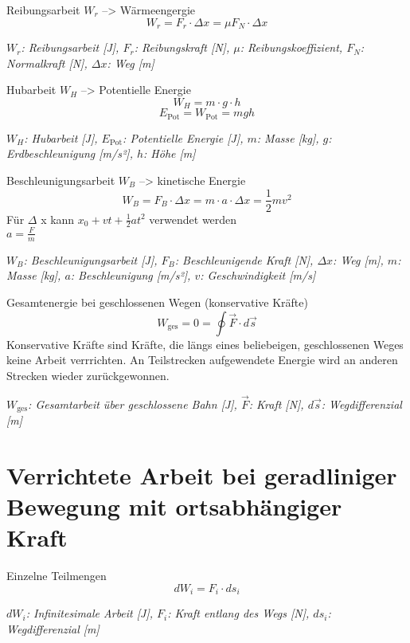 \documentclass[a4paper,10pt]{article}
\newenvironment{displayformula}
{
	\begin{framed}
		\color{formulaColor}
	}
	{\end{framed}}
\newcommand{\formulalegend}[1]{%
	\par\vspace{0.5ex}%
	{{\color{legendColor}\RaggedRight\small\textit{#1}}}%
	\par\vspace{1.5ex}%
}
\begin{document}
\begin{displayformula}
	Reibungsarbeit \( W_r \) --> Wärmeengergie
	\[
	W_r = F_r \cdot \Delta x = \mu F_N \cdot \Delta x
	\]
\end{displayformula}
\formulalegend{
	\( W_r \): Reibungsarbeit [J], \( F_r \): Reibungskraft [N], \( \mu \): Reibungskoeffizient, \( F_N \): Normalkraft [N], \( \Delta x \): Weg [m]
}

\begin{displayformula}
	Hubarbeit \( W_H \) --> Potentielle Energie
	\[
	W_H = m \cdot g \cdot h
	\]
	\[
	E_{\text{Pot}} = W_{\text{Pot}} = mgh
	\]
\end{displayformula}
\formulalegend{
	\( W_H \): Hubarbeit [J], \( E_{\text{Pot}} \): Potentielle Energie [J], \( m \): Masse [kg], \( g \): Erdbeschleunigung [m/s²], \( h \): Höhe [m]
}

\begin{displayformula}
	Beschleunigungsarbeit \( W_B \) --> kinetische Energie
	\[
	W_B = F_B \cdot \Delta x = m \cdot a \cdot \Delta x = \frac{1}{2} mv^2
	\]
	Für $\Delta$ x kann $x_0 + vt + \frac{1}{2} at^2$ verwendet werden \\
	$a = \frac{F}{m}$
\end{displayformula}
\formulalegend{
	\( W_B \): Beschleunigungsarbeit [J], \( F_B \): Beschleunigende Kraft [N], \( \Delta x \): Weg [m], \( m \): Masse [kg], \( a \): Beschleunigung [m/s²], \( v \): Geschwindigkeit [m/s]
}

\begin{displayformula}
	Gesamtenergie bei geschlossenen Wegen (konservative Kräfte)
	\[
	W_{\text{ges}} = 0 = \oint \vec{F} \cdot d\vec{s}
	\]
	Konservative Kräfte sind Kräfte, die längs eines beliebeigen, geschlossenen Weges keine Arbeit verrrichten. An Teilstrecken aufgewendete Energie wird an anderen Strecken wieder zurückgewonnen.
\end{displayformula}
\formulalegend{
	\( W_{\text{ges}} \): Gesamtarbeit über geschlossene Bahn [J], \( \vec{F} \): Kraft [N], \( d\vec{s} \): Wegdifferenzial [m]
}

\section{Verrichtete Arbeit bei geradliniger Bewegung mit ortsabhängiger Kraft}

\begin{displayformula}
	Einzelne Teilmengen
	\[
	dW_i = F_i \cdot ds_i
	\]
\end{displayformula}
\formulalegend{
	\( dW_i \): Infinitesimale Arbeit [J], \( F_i \): Kraft entlang des Wegs [N], \( ds_i \): Wegdifferenzial [m]
}
\end{document}
